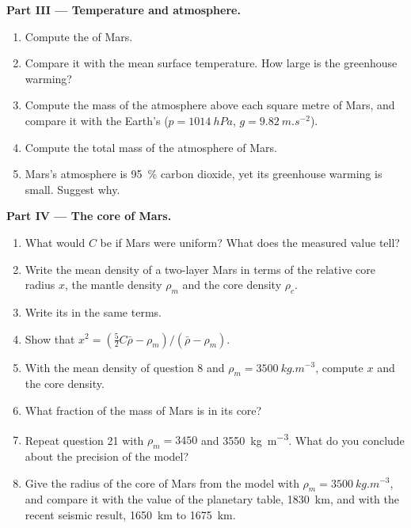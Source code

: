 \begin{problem}
\medskip
\noindent\textbf{Part III --- Temperature and atmosphere.}
\begin{enumerate}[resume]
  \item Compute the  of Mars.
  \item Compare it with the mean surface temperature. How large is the
        greenhouse warming?
  \item Compute the mass of the atmosphere above each square metre of Mars,
        and compare it with the Earth's ($p = \qty{1014}{hPa}$,
        $g = \qty{9.82}{m.s^{-2}}$).
  \item Compute the total mass of the atmosphere of Mars.
  \item Mars's atmosphere is \qty{95}{\percent} carbon dioxide, yet its
        greenhouse warming is small. Suggest why.
\end{enumerate}

\medskip
\noindent\textbf{Part IV --- The core of Mars.}
\begin{enumerate}[resume]
  \item What would $C$ be if Mars were uniform? What does the measured
        value tell?
  \item Write the mean density of a two-layer Mars in terms of the relative
        core radius $x$, the mantle density $\rho_m$ and the core density
        $\rho_c$.
  \item Write its  in the same terms.
  \item Show that $x^2 = (\tfrac52C\bar\rho - \rho_m)/(\bar\rho - \rho_m)$.
  \item With the mean density of question 8 and $\rho_m =
        \qty{3500}{kg.m^{-3}}$, compute $x$ and the core density.
  \item What fraction of the mass of Mars is in its core?
  \item Repeat question 21 with $\rho_m = 3450$ and
        \qty{3550}{kg.m^{-3}}. What do you conclude about the precision of
        the model?
  \item Give the radius of the core of Mars from the model with
        $\rho_m = \qty{3500}{kg.m^{-3}}$, and compare it with the value of
        the planetary table, \qty{1830}{km}, and with the recent seismic
        result, \qty{1650}{km} to \qty{1675}{km}.
\end{enumerate}
\end{problem}
